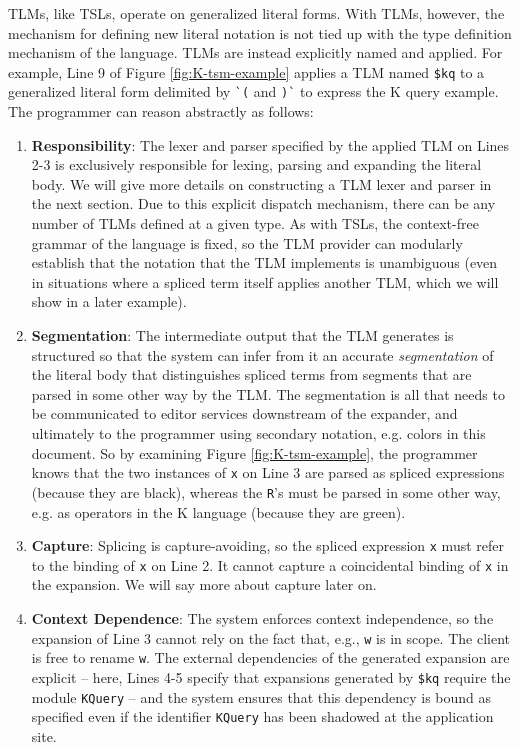 \documentclass[acmsmall,review,anonymous]{acmart}\settopmatter{printfolios=true,printccs=false,printacmref=false}
\newcommand{\li}[1]{\lstinline[basicstyle=\ttfamily\fontsize{9pt}{1em}\selectfont]{#1}}
\begin{document}
TLMs, like TSLs, operate on generalized literal forms. With TLMs, however, the mechanism for defining new literal notation is not tied up with the type definition mechanism of the language. TLMs are instead explicitly named and applied. For example, Line 9 of Figure \ref{fig:K-tsm-example} applies a TLM named \li{$kq} to a generalized literal form delimited by \li{`(} and \li{)`} to express the K query example. The programmer can reason abstractly as follows:
\begin{enumerate}[leftmargin=12pt]
\item[\CIRCLE] \textbf{Responsibility}: The lexer and parser specified by the applied TLM on Lines 2-3 is exclusively responsible for lexing, parsing and expanding the literal body. We will give more details on constructing a TLM lexer and parser in the next section. Due to this explicit dispatch mechanism, there can be any number of TLMs defined at a given type. As with TSLs, the context-free grammar of the language is fixed, so the TLM provider can modularly establish that the notation that the TLM implements is unambiguous (even in situations where a spliced term itself applies another TLM, which we will show in a later example).
\item[\CIRCLE] \textbf{Segmentation}: The intermediate output that the TLM generates is structured so that the system can infer from it an accurate \emph{segmentation} of the literal body that distinguishes spliced terms from segments that are parsed in some other way by the TLM. The segmentation is all that needs to be communicated to editor services downstream of the expander, and ultimately to the programmer using secondary notation, e.g. colors in this document. So by examining Figure \ref{fig:K-tsm-example}, the programmer knows that the two instances of \li{x} on Line 3 are parsed as spliced expressions (because they are black), whereas the \li{R}'s must be parsed in some other way, e.g. as operators in the K language (because they are green).
\item[\CIRCLE] \textbf{Capture}: Splicing is capture-avoiding, so the spliced expression \li{x} must refer to the binding of \li{x} on Line 2. It cannot capture a coincidental binding of \li{x} in the expansion. We will say more about capture later on.
\item[\CIRCLE] \textbf{Context Dependence}: The system enforces context independence, so the expansion of Line 3 cannot  rely on the fact that, e.g., \li{w} is in scope. The client is free to rename \li{w}. The external dependencies of the generated expansion are explicit -- here, Lines 4-5 specify that expansions generated by \li{$kq} require the module \li{KQuery} -- and the system ensures that this dependency is  bound as specified even if the identifier \li{KQuery} has been shadowed at the application site.

\end{enumerate}
\end{document}
